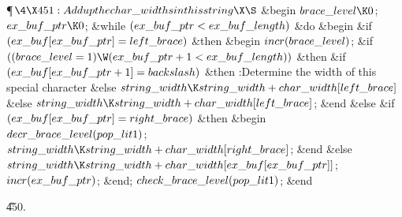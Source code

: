 \Y\P$\4\X451:Add up the \\{char\_width}s in this string\X\S$\6
\&{begin} $\\{brace\_level}\K0$;\6
$\\{ex\_buf\_ptr}\K0$;\6
\&{while} $(\\{ex\_buf\_ptr}<\\{ex\_buf\_length})$ \1\&{do}\6
\&{begin} \&{if} $(\\{ex\_buf}[\\{ex\_buf\_ptr}]=\\{left\_brace})$ \1%
\&{then}\6
\&{begin} $\\{incr}(\\{brace\_level})$;\6
\&{if} $((\\{brace\_level}=1)\W(\\{ex\_buf\_ptr}+1<\\{ex\_buf\_length}))$ \1%
\&{then}\6
\&{if} $(\\{ex\_buf}[\\{ex\_buf\_ptr}+1]=\\{backslash})$ \1\&{then}\5
:Determine the width of this special character\X\6
\4\&{else} $\\{string\_width}\K\\{string\_width}+\\{char\_width}[\\{left%
\_brace}]$\2\6
\4\&{else} $\\{string\_width}\K\\{string\_width}+\\{char\_width}[\\{left%
\_brace}]$;\2\6
\&{end}\6
\4\&{else} \&{if} $(\\{ex\_buf}[\\{ex\_buf\_ptr}]=\\{right\_brace})$ \1\&{then}%
\6
\&{begin} $\\{decr\_brace\_level}(\\{pop\_lit1})$;\5
$\\{string\_width}\K\\{string\_width}+\\{char\_width}[\\{right\_brace}]$;\6
\&{end}\6
\4\&{else} $\\{string\_width}\K\\{string\_width}+\\{char\_width}[\\{ex\_buf}[%
\\{ex\_buf\_ptr}]]$;\2\2\6
$\\{incr}(\\{ex\_buf\_ptr})$;\6
\&{end};\2\6
$\\{check\_brace\_level}(\\{pop\_lit1})$;\6
\&{end}\par
\U450.\fi

